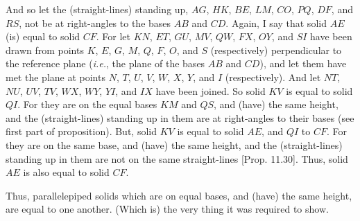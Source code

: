\begin{Parallel}{}{}
{\epsfysize=1.8in
\centerline{}

And so let the (straight-lines) standing up, $AG$, $HK$, $BE$,
$LM$, $CO$, $PQ$, $DF$, and $RS$, not be at right-angles to
the bases $AB$ and $CD$. Again, I say that solid $AE$ (is) equal to
solid  $CF$. For let $KN$, $ET$, $GU$, $MV$, $QW$, $FX$, $OY$, and
$SI$ have been drawn from points $K$, $E$, $G$, $M$, $Q$, $F$, $O$, and
$S$ (respectively) perpendicular to the reference plane ({\em i.e.}, the plane of the bases $AB$ and $CD$), and let them have met
the plane at points $N$, $T$, $U$, $V$, $W$, $X$, $Y$, and $I$ (respectively). And let $NT$, $NU$, $UV$, $TV$, $WX$, $WY$, $YI$, and
$IX$ have been joined. So solid $KV$ is equal to solid $QI$. For they are on
the equal bases $KM$ and $QS$, and (have) the same height, and the (straight-lines) standing up in them are at right-angles to their bases (see first part of proposition).  But, solid $KV$ is equal to
solid $AE$, and $QI$ to $CF$.
For they are on the same base, and (have)
the same height, and the (straight-lines) standing up in them are not on
the same straight-lines [Prop. 11.30]. Thus,
solid $AE$ is also equal to solid $CF$.

Thus, parallelepiped solids which are on equal bases,
and (have) the same height, are equal to one another. (Which is) the very thing
it was required to show.}
\end{Parallel}

